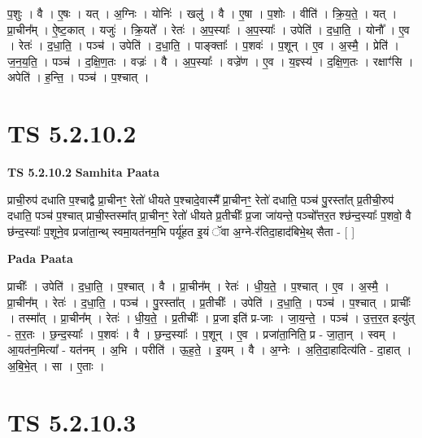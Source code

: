 \documentclass[17pt]{extarticle}
\begin{document}
प॒शुः । वै । ए॒षः । यत् । अ॒ग्निः । योनिः॑ । खलु॑ । वै । ए॒षा । प॒शोः । वीति॑ । क्रि॒य॒ते॒ । यत् । प्रा॒चीन᳚म् । ऐ॒ष्ट॒कात् । यजुः॑ । क्रि॒यते᳚ । रेतः॑ । अ॒प॒स्याः᳚ । अ॒प॒स्याः᳚ । उपेति॑ । द॒धा॒ति॒ । योनौ᳚ । ए॒व । रेतः॑ । द॒धा॒ति॒ । पञ्च॑ । उपेति॑ । द॒धा॒ति॒ । पाङ्क्ताः᳚ । प॒शवः॑ । प॒शून् । ए॒व । अ॒स्मै॒ । प्रेति॑ । ज॒न॒य॒ति॒ । पञ्च॑ । द॒क्षि॒ण॒तः । वज्रः॑ । वै । अ॒प॒स्याः᳚ । वज्रे॑ण । ए॒व । य॒ज्ञ्स्य॑ । द॒क्षि॒ण॒तः । रक्षाꣳ॑सि । अपेति॑ । ह॒न्ति॒ । पञ्च॑ । प॒श्चात् ।  \newline





\section{ TS 5.2.10.2 }

\textbf{TS 5.2.10.2 } \newline
\textbf{Samhita Paata} \newline

प्राची॒रुप॑ दधाति प॒श्चाद्वै प्रा॒चीनꣳ॒॒ रेतो॑ धीयते प॒श्चादे॒वास्मै᳚ प्रा॒चीनꣳ॒॒ रेतो॑ दधाति॒ पञ्च॑ पु॒रस्ता᳚त् प्र॒तीची॒रुप॑ दधाति॒ पञ्च॑ प॒श्चात् प्राची॒स्तस्मा᳚त् प्रा॒चीनꣳ॒॒ रेतो॑ धीयते प्र॒तीचीः᳚ प्र॒जा जा॑यन्ते॒ पञ्चो᳚त्तर॒त श्छ॑न्द॒स्याः᳚ प॒शवो॒ वै छ॑न्द॒स्याः᳚ प॒शूने॒व प्रजा॑ता॒न्थ् स्वमा॒यत॑नम॒भि पर्यू॑हत इ॒यं ॅवा अ॒ग्ने-र॑तिदा॒हाद॑बिभे॒थ् सैता - [  ] \newline

\textbf{Pada Paata} \newline

प्राचीः᳚ । उपेति॑ । द॒धा॒ति॒ । प॒श्चात् । वै । प्रा॒चीन᳚म् । रेतः॑ । धी॒य॒ते॒ । प॒श्चात् । ए॒व । अ॒स्मै॒ । प्रा॒चीन᳚म् । रेतः॑ । द॒धा॒ति॒ । पञ्च॑ । पु॒रस्ता᳚त् । प्र॒तीचीः᳚ । उपेति॑ । द॒धा॒ति॒ । पञ्च॑ । प॒श्चात् । प्राचीः᳚ । तस्मा᳚त् । प्रा॒चीन᳚म् । रेतः॑ । धी॒य॒ते॒ । प्र॒तीचीः᳚ । प्र॒जा इति॑ प्र-जाः । जा॒य॒न्ते॒ । पञ्च॑ । उ॒त्त॒र॒त इत्यु॑त् - त॒र॒तः । छ॒न्द॒स्याः᳚ । प॒शवः॑ । वै । छ॒न्द॒स्याः᳚ । प॒शून् । ए॒व । प्रजा॑ता॒निति॒ प्र - जा॒ता॒न् । स्वम् । आ॒यत॑न॒मित्या᳚ - यत॑नम् । अ॒भि । परीति॑ । ऊ॒ह॒ते॒ । इ॒यम् । वै । अ॒ग्नेः । अ॒ति॒दा॒हादित्य॑ति - दा॒हात् । अ॒बि॒भे॒त् । सा । ए॒ताः ।  \newline





\section{ TS 5.2.10.3 }
\end{document}
